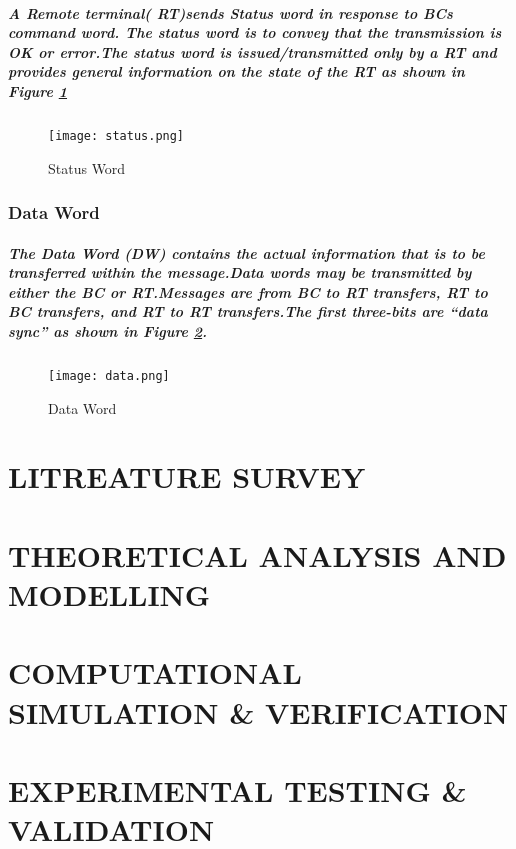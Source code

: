 \documentclass[12pt,a4paper]{report}
\begin{document}
\paragraph{\textrm{\textmd{A Remote terminal( RT)sends Status word in response to BCs command word. The status word is to convey that the transmission is OK or error.The status word is issued/transmitted only by a RT and provides general information on the state of the RT as shown in Figure \ref{fig:sts} }}}
\begin{figure}[h]
	\centering
	\texttt{[image: status.png]}
	\caption{Status Word}
	\label{fig:sts}
\end{figure}
\subsection{Data Word}
\paragraph{\textrm{\textmd{ The Data Word (DW) contains the actual information that is to be transferred within the message.Data words may be transmitted by either the BC or RT.Messages are from BC to RT transfers, RT to BC transfers, and RT to RT transfers.The first three-bits are “data sync” as shown in Figure \ref{fig:data}.}}}
\begin{figure}[h]
	\centering
	\texttt{[image: data.png]}
	\caption{Data Word}
	\label{fig:data}
\end{figure}


\chapter{\large \MakeUppercase{Litreature Survey}}
\chapter{\large \MakeUppercase {Theoretical Analysis and Modelling}}
\chapter{\large \MakeUppercase {Computational Simulation \& verification}}
\chapter{\large \MakeUppercase {Experimental Testing \& Validation}}
\end{document}
